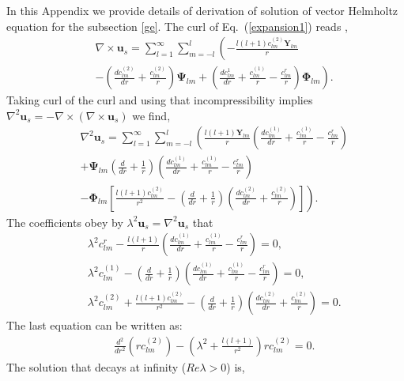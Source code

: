 \documentclass[aps,prx,twocolumn,amsmath,amssymb,amsfonts]{revtex4-2}
\begin{document}
{{\begin{appendices}
In this Appendix we provide details of derivation of solution of vector Helmholtz equation for the subsection \ref{ge}. The curl of Eq.~(\ref{expansion1}) reads \cite{sph},
\begin{eqnarray}&&
\nabla\times \bm u_s=\sum_{l=1}^{\infty}\sum_{m=-l}^l \left(-\frac{l(l+1)c^{(2)}_{lm}\bm Y_{lm}}{r}
\right.\\&&\left.-\left(\frac{dc^{(2)}_{lm}}{dr}+\frac{c^{(2)}_{lm}}{r}\right)\bm \Psi_{lm}+\left(\frac{dc^1_{lm}}{dr}+\frac{c^{(1)}_{lm}}{r}-\frac{c^r_{lm}}{r}\right)
\bm \Phi_{lm}\right).\nonumber
\end{eqnarray}
Taking curl of the curl and using that incompressibility implies $\nabla^2\bm u_s=-\nabla\times (\nabla\times \bm u_s)$ we find,
\begin{eqnarray}&&
\nabla^2\bm u_s=\sum_{l=1}^{\infty}\sum_{m=-l}^l \left(\frac{l(l+1)\bm Y_{lm}}{r}\left(\frac{dc^{(1)}_{lm}}{dr}+\frac{c^{(1)}_{lm}}{r}-\frac{c^r_{lm}}{r}\right)
\right.\nonumber\\&&\left.+\bm \Psi_{lm}\left(\frac{d}{dr}+\frac{1}{r}\right)\left(\frac{dc^{(1)}_{lm}}{dr}+\frac{c^{(1)}_{lm}}{r}-\frac{c^r_{lm}}{r}\right)
\right.\\&&\left.
-\bm \Phi_{lm}\left[\frac{l(l+1)c^{(2)}_{lm}}{r^2}-\left(\frac{d}{dr}+
\frac{1}{r}\right)\left(\frac{dc^{(2)}_{lm}}{dr}+\frac{c^{(2)}_{lm}}{r}\right)\right]
\right).\nonumber
\end{eqnarray}
The coefficients obey by $\lambda^2\bm u_s=\nabla^2\bm u_s$ that
\begin{eqnarray}&&
\lambda^2 c^r_{lm}-\frac{l(l+1)}{r}\left(\frac{dc^{(1)}_{lm}}{dr}+\frac{c^{(1)}_{lm}}{r}-\frac{c^r_{lm}}{r}\right)
=0,\label{daw}\\&&
\lambda^2 c^{(1)}_{lm}-\left(\frac{d}{dr}+\frac{1}{r}\right)\left(\frac{dc^{(1)}_{lm}}{dr}+\frac{c^{(1)}_{lm}}{r}-\frac{c^r_{lm}}{r}\right)=0,\nonumber\\&&
\lambda^2c^{(2)}_{lm}+\frac{l(l+1)c^{(2)}_{lm}}{r^2}-\left(\frac{d}{dr}+\frac{1}{r}\right)\left(\frac{dc^{(2)}_{lm}}{dr}+\frac{c^{(2)}_{lm}}{r}\right)=0.\nonumber
\end{eqnarray}
The last equation can be written as:
\begin{eqnarray}&&\!\!\!\!\!\!\!\!\!\!\!\!
\frac{d^2}{dr^2}\left(rc^{(2)}_{lm}\right)-\left(\lambda^2+\frac{l(l+1)}{r^2}\right)rc^{(2)}_{lm}=0.\label{d1}%
\end{eqnarray}
The solution that decays at infinity ($Re \lambda>0$) is,
\begin{eqnarray}&&\!\!\!\!\!\!\!\!\!\!\!\!

\end{eqnarray}
\end{appendices}}}
\end{document}
